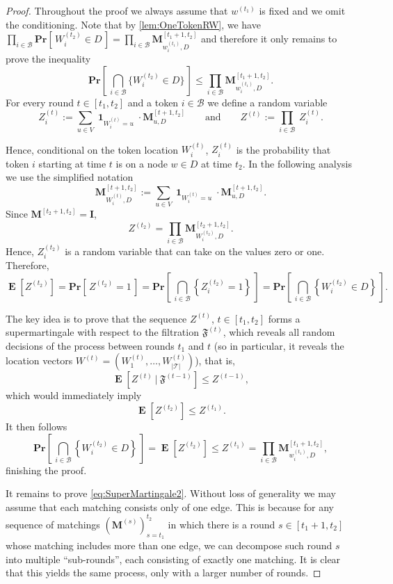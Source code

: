 \documentclass[twoside,leqno]{article}
\DeclareMathOperator{\E}{\mathbf{E}}
\newcommand{\Pro}[1]{\mathbf{Pr} \left[\,#1\,\right]}
\newcommand{\M}{\mathbf{M}}
\newcommand{\B}{\mathcal{B}}
\DeclareMathOperator{\1}{\mathbf{1}}
\numberwithin{equation}{section}
\begin{document}
\begin{proof}
Throughout the proof we always assume that $w^{(t_1)}$ is fixed and we omit the conditioning.
Note that by \cref{lem:OneTokenRW}, we have $ \prod_{ i \in \mathcal{B}} \Pro{ W_i^{(t_2)} \in D } = \prod_{i \in \mathcal{B}} \M_{w_i^{(t_1)},D}^{[t_1+1,t_2]} $  and therefore it only remains to prove the inequality
\[ \Pro{ \bigcap_{ i \in \mathcal{B} } \{ W_i^{(t_2)} \in D \} }\leq \prod_{i \in \mathcal{B}} \M_{w_i^{(t_1)},D}^{[t_1+1,t_2]}.\]
For every round $t\in[t_1,t_2]$ and a token $i \in \B$ we define a random variable
\begin{equation}
Z_i^{(t)}:= \sum_{u\in V}\1_{W_i^{(t)}=u}\cdot \M_{u,D}^{[t+1,t_2]} \qquad \text{and} \qquad Z^{(t)}:=\prod_{i \in \mathcal{B}} \ Z_i^{(t)}. \label{eq:Z-Mar}    
\end{equation}

Hence, conditional on the token location $W_i^{(t)}$, $Z_i^{(t)}$ is the probability that token $i$ starting at time $t$ is on a node $w\in D$ at time $t_2$. 
In the following analysis we use the simplified notation \[\M_{W_i^{(t)},D}^{[t+1,t_2]} := \sum_{u\in V}\1_{W_i^{(t)}=u} \cdot \M_{u,D}^{[t+1,t_2]}.\]
Since $\M^{[t_2+1,t_2]} = \mathbf{I}$, 
\[Z^{(t_2)} = \prod_{i\in \B}\M_{W_i^{(t_2)},D}^{[t_2+1,t_2]}.\]
Hence, $Z_i^{(t_2)}$ is a random variable that can take on the values zero or one.
Therefore,
\[\E\left[Z^{(t_2)}\right]=\Pro{Z^{(t_2)}=1} =
\Pro{ \bigcap_{i \in \mathcal{B}} \left\{ Z_i^{(t_2)}=1 \right\} } =
\Pro{\bigcap_{i\in \B}\left\{W_i^{(t_2)}\in D\right\}}.\]

The key idea is to prove that the sequence $Z^{(t)}$, $t\in[t_1,t_2]$ forms a supermartingale with respect to 
the filtration $\mathfrak{F}^{(t)}$, which reveals all random decisions of the process between rounds $t_1$ and $t$ (so in particular, it reveals the location vectors $W^{(t)}=\left(W_1^{(t)},\ldots, W_{|\mathcal{T}|}^{(t)} \right)$), that is,
\begin{equation}\label{eq:SuperMartingale2}
\E\left[Z^{(t)}~|~ \mathfrak{F}^{(t-1)} \right] \le Z^{(t-1)},
\end{equation}
which would immediately imply
\[\E\left[Z^{(t_2)}\right] \leq Z^{(t_1)}.\]
It then follows
\[\Pro{\bigcap_{i\in \B}\left\{W_i^{(t_2)}\in D\right\}}=\E\left[Z^{(t_2)}\right] \le Z^{(t_1)} = \prod_{i\in \B} \M_{w_i^{(t_1)},D}^{[t_1+1,t_2]},\]
finishing the proof.

It remains to prove \cref{eq:SuperMartingale2}.
Without loss of generality we may assume that each matching consists only of one edge. This is because for any sequence of matchings $(\M^{(s)})_{s=t_1}^{t_2}$ in which there is a round $s \in [t_1+1,t_2]$ whose matching includes more than one edge, we can decompose such round $s$ into multiple ``sub-rounds'', each consisting of exactly one matching. It is clear that this yields the same process, only with a larger number of rounds.


\end{proof}
\end{document}
